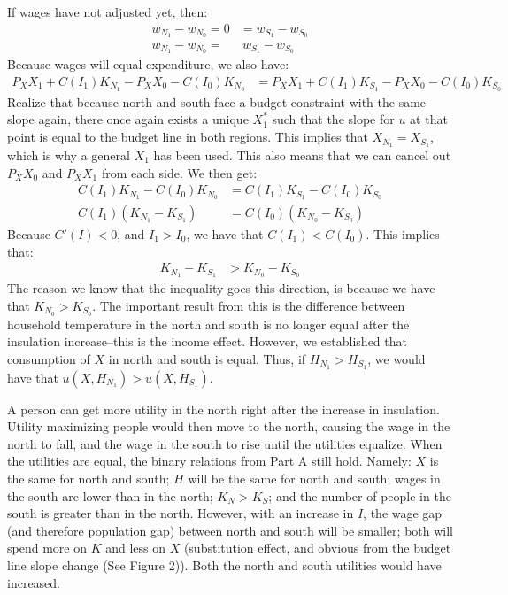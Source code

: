 \documentclass[12pt]{paper}
\begin{document}
If wages have not adjusted yet, then: 
\begin{align*}
w_{N_1}-w_{N_0}=0&=w_{S_1}-w_{S_0}\\
w_{N_1}-w_{N_0}=&~w_{S_1}-w_{S_0}
\end{align*}
Because wages will equal expenditure, we also have:
\begin{align*}
P_XX_1+C(I_1)K_{N_1}-P_XX_0-C(I_0)K_{N_0}&=P_XX_1+C(I_1)K_{S_1}-P_XX_0-C(I_0)K_{S_0}
\end{align*}
Realize that because north and south face a budget constraint with the same slope again, there once again exists a unique $X^*_1$ such that the slope for $u$ at that point is equal to the budget line in both regions. This implies that $X_{N_1}=X_{S_1}$, which is why a general $X_1$ has been used. This also means that we can cancel out $P_XX_0$ and $P_XX_1$ from each side. We then get:
\begin{align*}
C(I_1)K_{N_1}-C(I_0)K_{N_0}&=C(I_1)K_{S_1}-C(I_0)K_{S_0}\\
C(I_1)(K_{N_1}-K_{S_1})&=C(I_0)(K_{N_0}-K_{S_0})
\end{align*}
Because $C'(I)<0$, and $I_1>I_0$, we have that $C(I_1)<C(I_0)$. This implies that:
\begin{align*}
K_{N_1}-K_{S_1}&>K_{N_0}-K_{S_0}
\end{align*}
The reason we know that the inequality goes this direction, is because we have that $K_{N_0}>K_{S_0}$. The important result from this is the difference between household temperature in the north and south is no longer equal after the insulation increase--this is the income effect. However, we established that consumption of $X$ in north and south is equal. Thus, if $H_{N_1}>H_{S_1}$, we would have that $u(X,H_{N_1})>u(X,H_{S_1}).$


A person can get more utility in the north right after the increase in insulation. Utility maximizing people would then move to the north, causing the wage in the north to fall, and the wage in the south to rise until the utilities equalize. When the utilities are equal, the binary relations from Part A still hold. Namely: $X$ is the same for north and south; $H$ will be the same for north and south; wages in the south are lower than in the north;  $K_N>K_S$; and the number of people in the south is greater than in the north. However, with an increase in $I$, the wage gap (and therefore population gap) between north and south will be smaller; both will spend more on $K$ and less on $X$ (substitution effect, and obvious from the budget line slope change (See Figure 2)). Both the north and south utilities would have increased.
\end{document}

